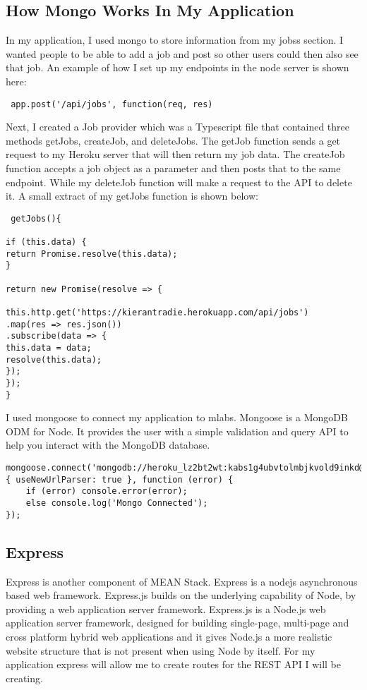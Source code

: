 \subsection{How Mongo Works In My Application}
In my application, I used mongo to store information from my jobss section. I wanted people to be able to add a job and post so other users could then also see that job. An example of how I set up my endpoints in the node server is shown here:

\begin{verbatim}
 app.post('/api/jobs', function(req, res)
\end{verbatim}

Next, I created a Job provider which was a Typescript file that contained three methods getJobs, createJob, and deleteJobs. The getJob function sends a get request to my Heroku server that will then return my job data. The createJob function accepts a job object as a parameter and then posts that to the same endpoint. While my deleteJob function will make a request to the API to delete it. A small extract of my getJobs function is shown below:

\begin{verbatim}
 getJobs(){

if (this.data) {
return Promise.resolve(this.data);
}

return new Promise(resolve => {

this.http.get('https://kierantradie.herokuapp.com/api/jobs')
.map(res => res.json())
.subscribe(data => {
this.data = data;
resolve(this.data);
});
});
}
\end{verbatim}

I used mongoose to connect my application to mlabs. Mongoose is a MongoDB ODM for Node. It provides the user with a simple validation and query API to help you interact with the MongoDB database.

\begin{verbatim}
mongoose.connect('mongodb://heroku_lz2bt2wt:kabs1g4ubvtolmbjkvold9inkd@ds227185.mlab.com:27185/heroku_lz2bt2wt',{ useNewUrlParser: true }, function (error) {
    if (error) console.error(error);
    else console.log('Mongo Connected');
});
\end{verbatim}


\subsection{Express}
Express is another component of MEAN Stack. Express is a nodejs asynchronous based web framework. Express.js builds on the underlying capability of Node, by providing a web application server framework. Express.js is a Node.js web application server framework, designed for building single-page, multi-page and cross platform hybrid web applications and it gives Node.js a more realistic website structure that is not present when using Node by itself. For my application express will allow me to create routes for the REST API I will be creating.\cite{expressjs}
